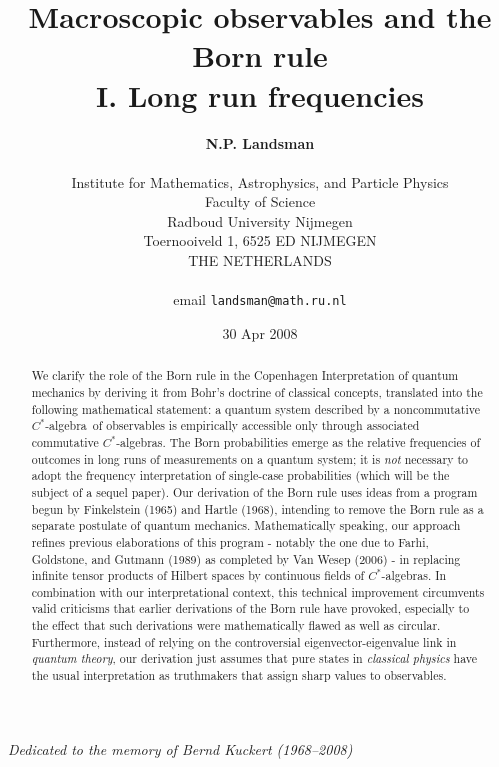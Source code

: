 \documentclass[12pt]{article}
\newcommand{\ca}{$C^*$-algebra} \newcommand{\jba}{JB-algebra}
\begin{document}
\setlength{\baselineskip}{1\baselineskip}
\thispagestyle{empty}
\title{Macroscopic observables and the Born rule \\ I. Long run frequencies}
\author{\textbf{N.P. Landsman} \\ \mbox{} \hfill \\
Institute for Mathematics, Astrophysics, and Particle Physics\\
Faculty of Science\\
Radboud University Nijmegen\\
Toernooiveld 1, 6525 ED NIJMEGEN\\
THE NETHERLANDS\\
\mbox{} \hfill \\
email \texttt{landsman@math.ru.nl}}
\date{30 Apr 2008}
\maketitle
\smallskip
\begin{center}{\it
Dedicated to the memory of Bernd Kuckert (1968--2008)}
\end{center}
\bigskip
\begin{abstract}
We  clarify the role of the Born rule in the Copenhagen Interpretation of quantum mechanics by deriving it from Bohr's doctrine of classical concepts, translated  into the following mathematical statement: a quantum system 
described by a noncommutative \ca\  of observables 
is empirically accessible only through associated commutative \ca s. 
The Born probabilities emerge as the relative frequencies of outcomes in long runs of measurements on a quantum system; it is {\it not} necessary to adopt the frequency interpretation of single-case probabilities (which will be the subject of a sequel paper).
Our derivation of the Born rule uses ideas from a program begun by Finkelstein (1965) and Hartle (1968), intending to remove the Born rule as a separate postulate of quantum mechanics. Mathematically speaking, our approach refines previous elaborations of this program - notably 
the one due to  Farhi, Goldstone, and Gutmann (1989) as completed by Van Wesep (2006) - in replacing infinite tensor products of Hilbert spaces by continuous fields of \ca s. 
In combination with our interpretational context, this technical improvement circumvents valid criticisms that earlier derivations of the Born rule have provoked, especially to the effect that such derivations were mathematically flawed as well as circular. Furthermore, instead of relying on the controversial eigenvector-eigenvalue link in \emph{quantum theory}, our derivation just assumes that 
 pure states in \emph{classical physics} have the usual interpretation as truthmakers that
assign sharp values to observables.
\end{abstract}\newpage
\end{document}
